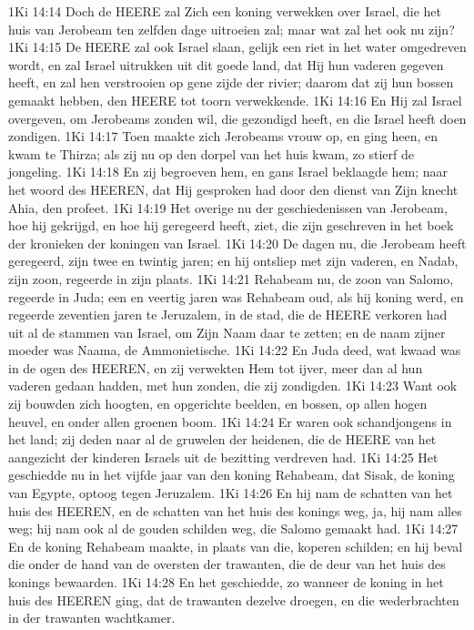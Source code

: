 1Ki 14:14  Doch de HEERE zal Zich een koning verwekken over Israel, die het huis van Jerobeam ten zelfden dage uitroeien zal; maar wat zal het ook nu zijn?
1Ki 14:15  De HEERE zal ook Israel slaan, gelijk een riet in het water omgedreven wordt, en zal Israel uitrukken uit dit goede land, dat Hij hun vaderen gegeven heeft, en zal hen verstrooien op gene zijde der rivier; daarom dat zij hun bossen gemaakt hebben, den HEERE tot toorn verwekkende.
1Ki 14:16  En Hij zal Israel overgeven, om Jerobeams zonden wil, die gezondigd heeft, en die Israel heeft doen zondigen.
1Ki 14:17  Toen maakte zich Jerobeams vrouw op, en ging heen, en kwam te Thirza; als zij nu op den dorpel van het huis kwam, zo stierf de jongeling.
1Ki 14:18  En zij begroeven hem, en gans Israel beklaagde hem; naar het woord des HEEREN, dat Hij gesproken had door den dienst van Zijn knecht Ahia, den profeet.
1Ki 14:19  Het overige nu der geschiedenissen van Jerobeam, hoe hij gekrijgd, en hoe hij geregeerd heeft, ziet, die zijn geschreven in het boek der kronieken der koningen van Israel.
1Ki 14:20  De dagen nu, die Jerobeam heeft geregeerd, zijn twee en twintig jaren; en hij ontsliep met zijn vaderen, en Nadab, zijn zoon, regeerde in zijn plaats.
1Ki 14:21  Rehabeam nu, de zoon van Salomo, regeerde in Juda; een en veertig jaren was Rehabeam oud, als hij koning werd, en regeerde zeventien jaren te Jeruzalem, in de stad, die de HEERE verkoren had uit al de stammen van Israel, om Zijn Naam daar te zetten; en de naam zijner moeder was Naama, de Ammonietische.
1Ki 14:22  En Juda deed, wat kwaad was in de ogen des HEEREN, en zij verwekten Hem tot ijver, meer dan al hun vaderen gedaan hadden, met hun zonden, die zij zondigden.
1Ki 14:23  Want ook zij bouwden zich hoogten, en opgerichte beelden, en bossen, op allen hogen heuvel, en onder allen groenen boom.
1Ki 14:24  Er waren ook schandjongens in het land; zij deden naar al de gruwelen der heidenen, die de HEERE van het aangezicht der kinderen Israels uit de bezitting verdreven had.
1Ki 14:25  Het geschiedde nu in het vijfde jaar van den koning Rehabeam, dat Sisak, de koning van Egypte, optoog tegen Jeruzalem.
1Ki 14:26  En hij nam de schatten van het huis des HEEREN, en de schatten van het huis des konings weg, ja, hij nam alles weg; hij nam ook al de gouden schilden weg, die Salomo gemaakt had.
1Ki 14:27  En de koning Rehabeam maakte, in plaats van die, koperen schilden; en hij beval die onder de hand van de oversten der trawanten, die de deur van het huis des konings bewaarden.
1Ki 14:28  En het geschiedde, zo wanneer de koning in het huis des HEEREN ging, dat de trawanten dezelve droegen, en die wederbrachten in der trawanten wachtkamer.
